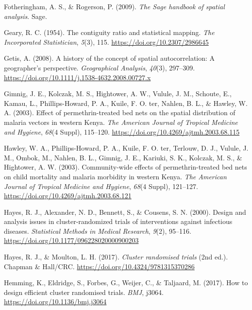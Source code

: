 \documentclass[
  12pt,
  prelim]{bios-prelim}
\newlength{\cslhangindent}
\newenvironment{CSLReferences}[2] %
 {\begin{list}{}{%
  \setlength{\itemindent}{0pt}
  \setlength{\leftmargin}{0pt}
  \setlength{\parsep}{0pt}
  \ifodd #1
   \setlength{\leftmargin}{\cslhangindent}
   \setlength{\itemindent}{-1\cslhangindent}
  \fi
  \setlength{\itemsep}{#2\baselineskip}}}
 {\end{list}}
\begin{document}
\begin{CSLReferences}{1}{0}
Fotheringham, A. S., \& Rogerson, P. (2009). \emph{The {Sage} handbook
of spatial analysis}. Sage.

Geary, R. C. (1954). The contiguity ratio and statistical mapping.
\emph{The Incorporated Statistician}, \emph{5}(3), 115.
\url{https://doi.org/10.2307/2986645}

Getis, A. (2008). A history of the concept of spatial autocorrelation: A
geographer's perspective. \emph{Geographical Analysis}, \emph{40}(3),
297--309. \url{https://doi.org/10.1111/j.1538-4632.2008.00727.x}

Gimnig, J. E., Kolczak, M. S., Hightower, A. W., Vulule, J. M., Schoute,
E., Kamau, L., Phillips-Howard, P. A., Kuile, F. O. ter, Nahlen, B. L.,
\& Hawley, W. A. (2003). Effect of permethrin-treated bed nets on the
spatial distribution of malaria vectors in western {Kenya}. \emph{The
American Journal of Tropical Medicine and Hygiene}, \emph{68}(4 Suppl),
115--120. \url{https://doi.org/10.4269/ajtmh.2003.68.115}

Hawley, W. A., Phillips-Howard, P. A., Kuile, F. O. ter, Terlouw, D. J.,
Vulule, J. M., Ombok, M., Nahlen, B. L., Gimnig, J. E., Kariuki, S. K.,
Kolczak, M. S., \& Hightower, A. W. (2003). Community-wide effects of
permethrin-treated bed nets on child mortality and malaria morbidity in
western {Kenya}. \emph{The American Journal of Tropical Medicine and
Hygiene}, \emph{68}(4 Suppl), 121--127.
\url{https://doi.org/10.4269/ajtmh.2003.68.121}

Hayes, R. J., Alexander, N. D., Bennett, S., \& Cousens, S. N. (2000).
Design and analysis issues in cluster-randomized trials of interventions
against infectious diseases. \emph{Statistical Methods in Medical
Research}, \emph{9}(2), 95--116.
\url{https://doi.org/10.1177/096228020000900203}

Hayes, R. J., \& Moulton, L. H. (2017). \emph{Cluster randomised trials}
(2nd ed.). Chapman \& Hall/CRC.
\url{https://doi.org/10.4324/9781315370286}

Hemming, K., Eldridge, S., Forbes, G., Weijer, C., \& Taljaard, M.
(2017). How to design efficient cluster randomised trials. \emph{BMJ},
j3064. \url{https://doi.org/10.1136/bmj.j3064}


\end{CSLReferences}
\end{document}
